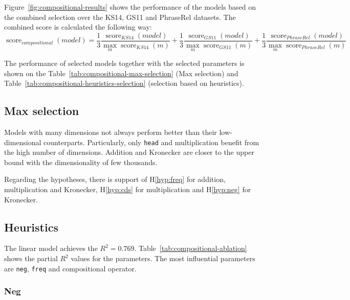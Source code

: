 

Figure~\ref{fig:compositional-results} shows the performance of the models based on the combined selection over the KS14, GS11 and PhraseRel datasets. The combined score is calculated the following way:
$$
\operatorname{score}_\mathit{compositional}(\mathit{model}) =%
\frac{1}{3}%
\frac{\operatorname{score}_\mathit{KS14}(model)}%
{\max_m\operatorname{score}_\mathit{KS14}(m)}%
+%
\frac{1}{3}%
\frac{\operatorname{score}_\mathit{GS11}(model)}%
{\max_m\operatorname{score}_\mathit{GS11}(m)}%
+%
\frac{1}{3}%
\frac{\operatorname{score}_\mathit{PhraseRel}(model)}%
{\max_m\operatorname{score}_\mathit{PhraseRel}(m)}%
$$

The performance of selected models together with the selected parameters is shown on the Table~\ref{tab:compositional-max-selection} (Max selection) and Table~\ref{tab:compositional-heuristics-selection} (selection based on heuristics).

\subsection{Max selection}
\label{sec:max-selection-compositional}

Models with many dimensions not always perform better than their low-dimensional counterparts. Particularly, only \texttt{head} and multiplication benefit from the high number of dimensions. Addition and Kronecker are closer to the upper bound with the dimensionality of few thousands.



Regarding the hypotheses, there is support of H\ref{hyp:freq} for addition, multiplication and Kronecker, H\ref{hyp:cds} for multiplication and H\ref{hyp:neg} for Kronecker.

\subsection{Heuristics}
\label{sec:heuristics-compositional}

The linear model achieves the $R^2 = 0.769$. Table~\ref{tab:compositional-ablation} shows the partial $R^2$ values for the parameters. The most influential parameters are \texttt{neg}, \texttt{freq} and compositional operator.

\subsubsection{Neg}
\label{sec:neg-compositional}

